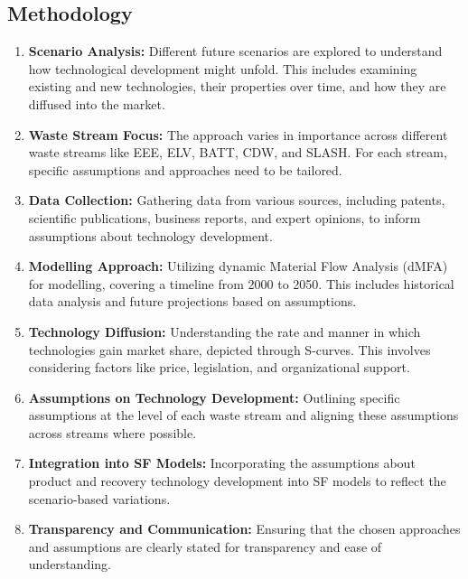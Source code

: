         \subsection{Methodology}
          
        \begin{enumerate}
          \item \textbf{Scenario Analysis:}\newline
          Different future scenarios are explored to understand how technological development might unfold. This includes examining existing and new technologies, their properties over time, and how they are diffused into the market.
          
          \item \textbf{Waste Stream Focus:}\newline
          The approach varies in importance across different waste streams like EEE, ELV, BATT, CDW, and SLASH. For each stream, specific assumptions and approaches need to be tailored.
          
          \item \textbf{Data Collection:}\newline
          Gathering data from various sources, including patents, scientific publications, business reports, and expert opinions, to inform assumptions about technology development.
          
          \item \textbf{Modelling Approach:}\newline
          Utilizing dynamic Material Flow Analysis (dMFA) for modelling, covering a timeline from 2000 to 2050. This includes historical data analysis and future projections based on assumptions.
          
          \item \textbf{Technology Diffusion:}\newline
          Understanding the rate and manner in which technologies gain market share, depicted through S-curves. This involves considering factors like price, legislation, and organizational support.
          
          \item \textbf{Assumptions on Technology Development:}\newline
          Outlining specific assumptions at the level of each waste stream and aligning these assumptions across streams where possible.
          
          \item \textbf{Integration into SF Models:}\newline
          Incorporating the assumptions about product and recovery technology development into SF models to reflect the scenario-based variations.
          
          \item \textbf{Transparency and Communication:}\newline
          Ensuring that the chosen approaches and assumptions are clearly stated for transparency and ease of understanding.
      \end{enumerate}
      
